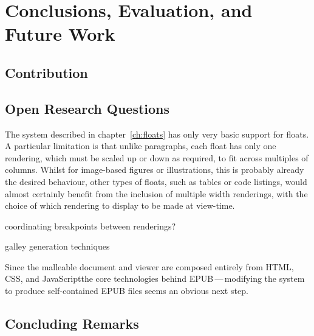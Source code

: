 \chapter{Conclusions, Evaluation, and Future Work}\label{ch:conclusions}

\section{Contribution}

\section{Open Research Questions}

The system described in chapter~\ref{ch:floats} has only very basic support for floats. A particular limitation is that unlike paragraphs, each float has only one rendering, which must be scaled up or down as required, to fit across multiples of columns. Whilst for image-based figures or illustrations, this is probably already the desired behaviour, other types of floats, such as tables or code listings, would almost certainly benefit from the inclusion of multiple width renderings, with the choice of which rendering to display to be made at view-time. %

coordinating breakpoints between renderings?

galley generation techniques


Since the malleable document and viewer are composed entirely from HTML, CSS, and JavaScript\ed the core technologies behind EPUB\,---\,modifying the system to produce self-contained EPUB files seems an obvious next step.

\section{Concluding Remarks}
